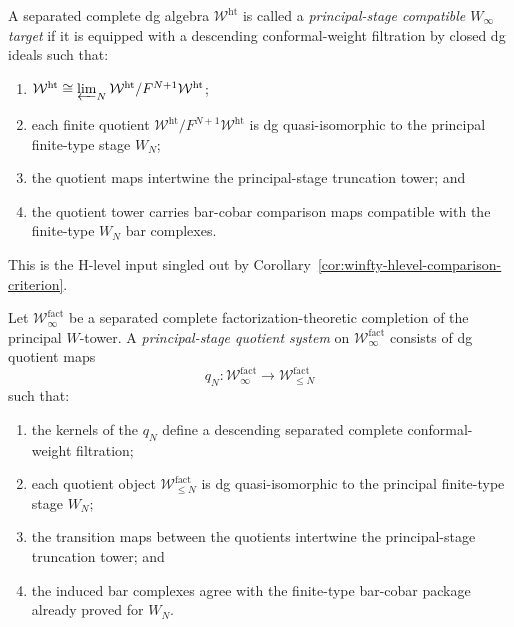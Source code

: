 \begin{definition}
\label{def:winfty-principal-stage-compatible}
A separated complete dg algebra $\mathcal{W}^{\mathrm{ht}}$ is called a
\emph{principal-stage compatible $W_\infty$ target} if it is equipped
with a descending conformal-weight filtration by closed dg ideals such
that:
\begin{enumerate}
\item $\mathcal{W}^{\mathrm{ht}} \cong
  \varprojlim_N \mathcal{W}^{\mathrm{ht}}/F^{N+1}\mathcal{W}^{\mathrm{ht}}$;
\item each finite quotient
  $\mathcal{W}^{\mathrm{ht}}/F^{N+1}\mathcal{W}^{\mathrm{ht}}$ is dg
  quasi-isomorphic to the principal finite-type stage $W_N$;
\item the quotient maps intertwine the principal-stage truncation tower;
  and
\item the quotient tower carries bar-cobar comparison maps compatible
  with the finite-type $W_N$ bar complexes.
\end{enumerate}
This is the H-level input singled out by
Corollary~\ref{cor:winfty-hlevel-comparison-criterion}.
\end{definition}

\begin{definition}
\label{def:winfty-quotient-system}
Let $\mathcal{W}^{\mathrm{fact}}_\infty$ be a separated complete
factorization-theoretic completion of the principal $W$-tower.  A
\emph{principal-stage quotient system} on
$\mathcal{W}^{\mathrm{fact}}_\infty$ consists of dg quotient maps
\[
q_N\colon \mathcal{W}^{\mathrm{fact}}_\infty \longrightarrow
\mathcal{W}^{\mathrm{fact}}_{\le N}
\]
such that:
\begin{enumerate}
\item the kernels of the $q_N$ define a descending separated complete
  conformal-weight filtration;
\item each quotient object
  $\mathcal{W}^{\mathrm{fact}}_{\le N}$ is dg quasi-isomorphic to the
  principal finite-type stage $W_N$;
\item the transition maps between the quotients intertwine the
  principal-stage truncation tower; and
\item the induced bar complexes agree with the finite-type bar-cobar
  package already proved for $W_N$.
\end{enumerate}
\end{definition}

